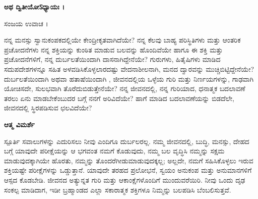 \begin{center}
{\textbf{ಅಥ ದ್ವಿತೀಯೋऽಧ್ಯಾಯಃ ।}\\}
\end{center}
ಸಂಜಯ ಉವಾಚ ।\\

\newpage
\begin{mananam}{}
\footnotesize \mananamtext ನನ್ನ ಮನಸ್ಸು ಸ್ವಾನುಕಂಪಕದಲ್ಲಿಯೇ ಕೇಂದ್ರೀಕೃತವಾಗಿದೆಯೇ? ನನ್ನ ಕೆಲವು ಬಾಹ್ಯ ಪರಿಸ್ಥಿತಿಗಳು ಮತ್ತು ಆಂತರಿಕ ಪ್ರಚೋದನೆಗಳು ನನ್ನ ಶಕ್ತಿಯನ್ನು ಕುಂಠಿತ ಮಾಡುವ ಬಲವನ್ನು ಹೊಂದಿವೆಯೇ ಹಾಗೂ ಈ ಶಕ್ತಿ ಮತ್ತು ಪ್ರಚೋದನೆಗಳಿಗೆ, ನನ್ನ ದುರ್ಬಲತೆಯಿಂದಾಗಿ ದಾಸನಾಗಿದ್ದೇನೆಯೇ? ಗುರುಗಳು, ಹಿತೈಷಿಗಳು ಮಾಡಿದ ಸದುಪದೇಶಗಳನ್ನೂ ಸಹಿತ ಅಳವಡಿಸಿಕೊಳ್ಳಲಾರದಷ್ಟು ವೇದನಾಶೀಲನಾಗಿ, ಮನದ ದ್ವಾರವನ್ನು ಮುಚ್ಚಿಬಿಟ್ಟಿದ್ದೇನೆಯೇ?\\
ದುರ್ಬಲತೆಯಿಂದಾಗಿ ಅಥವಾ ಹತಾಷೆಯಿಂದಾಗಿ , ಜೀವನದಲ್ಲಿಯ ಒಳ್ಳೆಯ ಗುರಿ ಮತ್ತು ನಿರ್ಣಯಗಳನ್ನು, ಗಾಢವಾಗಿ ಯೋಚಿಸದೇ, ಸುಲಭವಾಗಿ ತೊರೆದುಬಿಡುತ್ತೇನೆಯೇ? ನನ್ನ ಜೀವನದಲ್ಲಿ, ನನ್ನ ಗುರಿಯಾದ, ಧನಾತ್ಮಕ ಬದಲಾವಣೆ ತರಲು ಏನು ಮಾಡಬೇಕೆಂಬುದರ ಬಗ್ಗೆ ನನಗೆ ಅರಿವಿದೆಯೇ? ಹಾಗೆ ಮಾಡಿದ ಬದಲಾವಣೆಯನ್ನು ಬಿಡದೆಲೇ, ಜೀವನದಲ್ಲಿ ಸ್ಥಿರಪಡಿಸುವ ಛಲವಿದೆಯೇ?
\end{mananam}
\WritingHand\enspace\textbf{ಆತ್ಮ ವಿಮರ್ಶೆ}\\
\begin{inspiration}{\mananamfont ಸ್ಪೂರ್ತಿ}
\footnotesize \mananamtext ಸವಾಲುಗಳನ್ನು ಎದುರಿಸಲು ನೀವು ಎಂದಿಗೂ ದುರ್ಬಲರಲ್ಲ. ನಮ್ಮ ಜೀವನದಲ್ಲಿ,  ಬುದ್ಧಿ, ಮನಸ್ಸು, ದೇಹದ ಬಗ್ಗೆ ಯಾವುದೇ ಪರೀಕ್ಷೆಯನ್ನು ಆ ಭಗವಂತ ನಮಗೆ ಕೊಡುವುದು, ನಮ್ಮ ಬಲ ವೃದ್ಧಿಸಿ ನಮ್ಮನ್ನು ಸಕ್ಷಮ ಮಾಡುವುದಕ್ಕಾಗಿಯೇ ಹೊರತು,  ನಮ್ಮನ್ನು ತೊಂದರೆಗೀಡುಮಾಡುವುದಕ್ಕಲ್ಲ; ಅಲ್ಲದೇ, ನಮಗೆ ಸಹಿಸಿಕೊಳ್ಳಲು ಇರುವ ಶಕ್ತಿಯಷ್ಟೇ ಪರೀಕ್ಷೆಗಳನ್ನು ಒಡ್ಡುತ್ತಾನೆ. ಯಾವುದೇ ತರಹದ ಪ್ರಲೋಭನೆ, ಸ್ವಯಂ ಅನುಕಂಪ ಮತ್ತು ಅನುಮಾನಗಳಿಗೆ ಆಸ್ಪದ ಕೊಡಬೇಡಿ. ಜೀವನದ ಅತ್ಯುನ್ನತ ಗುರಿ ಮತ್ತು ಆಕಾಂಕ್ಷೆಗಳೊಂದಿಗೆ ಮುಂದುವರೆಯಿರಿ. ನೀವು ಒಂದು ದೃಢ ಸಂಕಲ್ಪ ಮಾಡಿದಾಗ, ಇಡೀ ಬ್ರಹ್ಮಾಂಡದ ಎಲ್ಲಾ ಸಕಾರಾತ್ಮಕ ಶಕ್ತಿಗಳೂ ನಿಮ್ಮನ್ನು ಬಲಪಡಿಸಿ ಬೆಂಬಲಿಸುತ್ತವೆ.
\end{inspiration}
\newpage

